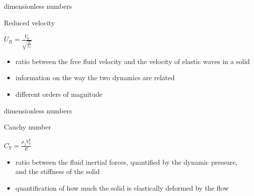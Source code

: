 \documentclass[10pt,t]{beamer}
\begin{document}
\begin{frame}{dimensionless numbers}
\label{dimensionless}
\begin{exampleblock}{Reduced velocity}

\vspace{0.8cm}

\begin{center}
    $U_R = \frac{V_0}{\sqrt{\frac{E}{\rho_S}}}$
\end{center}


\end{exampleblock}


\begin{itemize}
    \item ratio between the free fluid velocity and the velocity of elastic waves in a solid
    \item information on the way the two dynamics are related
    \item different orders of magnitude
\end{itemize}

\end{frame}


\begin{frame}{dimensionless numbers}

\begin{exampleblock}{Cauchy number}

\begin{center}
    $C_Y = \frac{\rho_f V_0^2}{E}$
\end{center}


\end{exampleblock}

\vspace{0.8cm}

\begin{itemize}
    \item ratio between the fluid inertial forces, quantified by the dynamic pressure, and the stiffness of the solid
    \item quantification of how much the solid is elastically deformed by the flow
\end{itemize}

\vspace{0.8cm}

\hyperlink{addedmass}{}

\end{frame}
\end{document}
